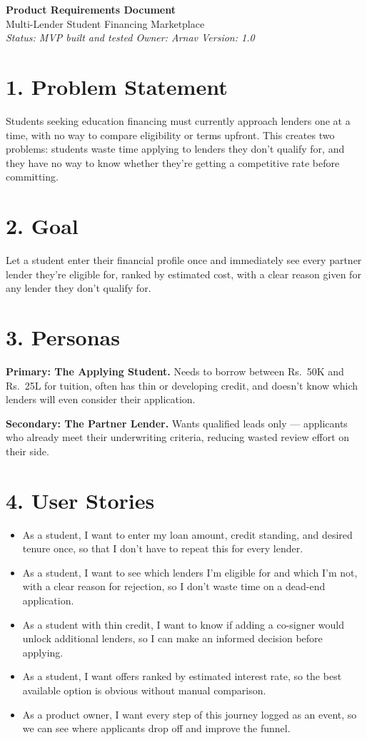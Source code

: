 \documentclass[10pt]{article}
\begin{document}
{\LARGE \textbf{\color{DeepBlue} Product Requirements Document}}\\
{\Large Multi-Lender Student Financing Marketplace}\\
\textit{Status: MVP built and tested \quad Owner: Arnav \quad Version: 1.0}

\section*{1. Problem Statement}
Students seeking education financing must currently approach lenders one at a time, with no way to compare eligibility or terms upfront. This creates two problems: students waste time applying to lenders they don't qualify for, and they have no way to know whether they're getting a competitive rate before committing.

\section*{2. Goal}
Let a student enter their financial profile once and immediately see every partner lender they're eligible for, ranked by estimated cost, with a clear reason given for any lender they don't qualify for.

\section*{3. Personas}
\textbf{Primary: The Applying Student.} Needs to borrow between Rs.~50K and Rs.~25L for tuition, often has thin or developing credit, and doesn't know which lenders will even consider their application.

\textbf{Secondary: The Partner Lender.} Wants qualified leads only --- applicants who already meet their underwriting criteria, reducing wasted review effort on their side.

\section*{4. User Stories}
\begin{itemize}[leftmargin=18pt, itemsep=3pt]
\item As a student, I want to enter my loan amount, credit standing, and desired tenure once, so that I don't have to repeat this for every lender.
\item As a student, I want to see which lenders I'm eligible for and which I'm not, with a clear reason for rejection, so I don't waste time on a dead-end application.
\item As a student with thin credit, I want to know if adding a co-signer would unlock additional lenders, so I can make an informed decision before applying.
\item As a student, I want offers ranked by estimated interest rate, so the best available option is obvious without manual comparison.
\item As a product owner, I want every step of this journey logged as an event, so we can see where applicants drop off and improve the funnel.
\end{itemize}
\end{document}
